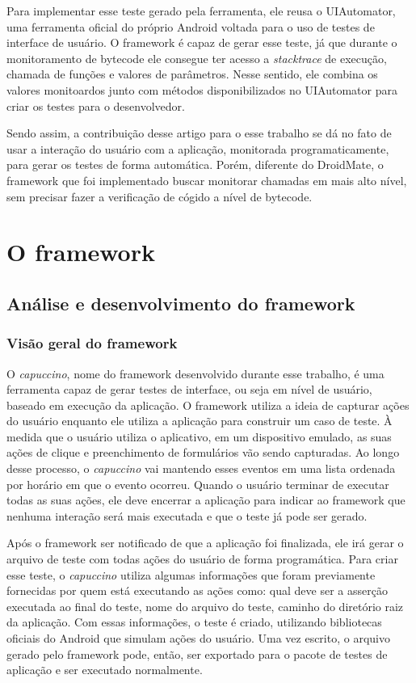\documentclass[
    12pt,       %
    openright,      %
    twoside,      %
    a4paper,      %
    english,      %
    french,       %
    spanish,      %
    brazil,       %
    ]{abntex2}
\begin{document}
      Para implementar esse teste gerado pela ferramenta, ele reusa o UIAutomator,
      uma ferramenta oficial do próprio Android voltada para o uso de testes de
      interface de usuário. O framework é capaz de gerar esse teste, já que durante
      o monitoramento de bytecode ele consegue ter acesso a \textit{stacktrace} de
      execução, chamada de funções e valores de parâmetros. Nesse sentido, ele
      combina os valores monitoardos junto com métodos disponibilizados no UIAutomator
      para criar os testes para o desenvolvedor.

      Sendo assim, a contribuição desse artigo para o esse trabalho se dá no fato de usar
      a interação do usuário com a aplicação, monitorada programaticamente, para gerar
      os testes de forma automática. Porém, diferente do DroidMate, o framework que
      foi implementado buscar monitorar chamadas em mais alto nível, sem precisar fazer
      a verificação de cógido a nível de bytecode.

  \part{O framework}
    \chapter{Análise e desenvolvimento do framework}
      \section{Visão geral do framework}
        O \textit{capuccino}, nome do framework desenvolvido durante esse trabalho, é uma ferramenta
        capaz de gerar testes de interface, ou seja em nível de usuário, baseado em execução da aplicação.
        O framework utiliza a ideia de capturar ações do usuário enquanto ele utiliza a aplicação para
        construir um caso de teste. À medida que o usuário utiliza o aplicativo, em um dispositivo emulado,
        as suas ações de clique e preenchimento de formulários vão sendo capturadas. Ao longo desse processo,
        o \textit{capuccino} vai mantendo esses eventos em uma lista ordenada por horário em que o evento
        ocorreu. Quando o usuário terminar de executar todas as suas ações, ele deve encerrar a aplicação
        para indicar ao framework que nenhuma interação será mais executada e que o teste já pode ser gerado.

        Após o framework ser notificado de que a aplicação foi finalizada, ele irá gerar o arquivo de teste com
        todas ações do usuário de forma programática. Para criar esse teste, o \textit{capuccino} utiliza
        algumas informações que foram previamente fornecidas por quem está executando as ações como: qual
        deve ser a asserção executada ao final do teste, nome do arquivo do teste, caminho do diretório raiz
        da aplicação. Com essas informações, o teste é criado, utilizando bibliotecas oficiais do Android
        que simulam ações do usuário. Uma vez escrito, o arquivo gerado pelo framework pode, então, ser
        exportado para o pacote de testes de aplicação e ser executado normalmente.
\end{document}

